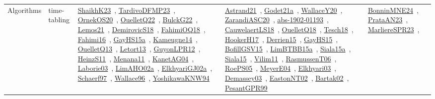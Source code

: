 {\begin{longtable}{lp{3cm}>{\raggedright\arraybackslash}p{6cm}>{\raggedright\arraybackslash}p{6cm}>{\raggedright\arraybackslash}p{8cm}}
\index{time-tabling}\index{Algorithms!time-tabling}Algorithms & time-tabling & \href{../works/ShaikhK23.pdf}{ShaikhK23}~\cite{ShaikhK23}, \href{../works/TardivoDFMP23.pdf}{TardivoDFMP23}~\cite{TardivoDFMP23}, \href{../works/OrnekOS20.pdf}{OrnekOS20}~\cite{OrnekOS20}, \href{../works/OuelletQ22.pdf}{OuelletQ22}~\cite{OuelletQ22}, \href{../works/BulckG22.pdf}{BulckG22}~\cite{BulckG22}, \href{../works/Lemos21.pdf}{Lemos21}~\cite{Lemos21}, \href{../works/DemirovicS18.pdf}{DemirovicS18}~\cite{DemirovicS18}, \href{../works/FahimiOQ18.pdf}{FahimiOQ18}~\cite{FahimiOQ18}, \href{../works/Fahimi16.pdf}{Fahimi16}~\cite{Fahimi16}, \href{../works/GayHS15a.pdf}{GayHS15a}~\cite{GayHS15a}, \href{../works/Kameugne14.pdf}{Kameugne14}~\cite{Kameugne14}, \href{../works/OuelletQ13.pdf}{OuelletQ13}~\cite{OuelletQ13}, \href{../works/Letort13.pdf}{Letort13}~\cite{Letort13}, \href{../works/GuyonLPR12.pdf}{GuyonLPR12}~\cite{GuyonLPR12}, \href{../works/HeinzS11.pdf}{HeinzS11}~\cite{HeinzS11}, \href{../works/Menana11.pdf}{Menana11}~\cite{Menana11}, \href{../works/KanetAG04.pdf}{KanetAG04}~\cite{KanetAG04}, \href{../works/Laborie03.pdf}{Laborie03}~\cite{Laborie03}, \href{../works/LimAHO02a.pdf}{LimAHO02a}~\cite{LimAHO02a}, \href{../works/ElkhyariGJ02a.pdf}{ElkhyariGJ02a}~\cite{ElkhyariGJ02a}, \href{../works/Schaerf97.pdf}{Schaerf97}~\cite{Schaerf97}, \href{../works/Wallace96.pdf}{Wallace96}~\cite{Wallace96}, \href{../works/YoshikawaKNW94.pdf}{YoshikawaKNW94}~\cite{YoshikawaKNW94} & \href{../works/Astrand21.pdf}{Astrand21}~\cite{Astrand21}, \href{../works/Godet21a.pdf}{Godet21a}~\cite{Godet21a}, \href{../works/WallaceY20.pdf}{WallaceY20}~\cite{WallaceY20}, \href{../works/ZarandiASC20.pdf}{ZarandiASC20}~\cite{ZarandiASC20}, \href{../works/abs-1902-01193.pdf}{abs-1902-01193}~\cite{abs-1902-01193}, \href{../works/CauwelaertLS18.pdf}{CauwelaertLS18}~\cite{CauwelaertLS18}, \href{../works/OuelletQ18.pdf}{OuelletQ18}~\cite{OuelletQ18}, \href{../works/Tesch18.pdf}{Tesch18}~\cite{Tesch18}, \href{../works/HookerH17.pdf}{HookerH17}~\cite{HookerH17}, \href{../works/Derrien15.pdf}{Derrien15}~\cite{Derrien15}, \href{../works/GayHS15.pdf}{GayHS15}~\cite{GayHS15}, \href{../works/BofillGSV15.pdf}{BofillGSV15}~\cite{BofillGSV15}, \href{../works/LimBTBB15a.pdf}{LimBTBB15a}~\cite{LimBTBB15a}, \href{../works/Siala15a.pdf}{Siala15a}~\cite{Siala15a}, \href{../works/Siala15.pdf}{Siala15}~\cite{Siala15}, \href{../works/Vilim11.pdf}{Vilim11}~\cite{Vilim11}, \href{../works/RasmussenT06.pdf}{RasmussenT06}~\cite{RasmussenT06}, \href{../works/RoePS05.pdf}{RoePS05}~\cite{RoePS05}, \href{../works/MeyerE04.pdf}{MeyerE04}~\cite{MeyerE04}, \href{../works/Elkhyari03.pdf}{Elkhyari03}~\cite{Elkhyari03}, \href{../works/Demassey03.pdf}{Demassey03}~\cite{Demassey03}, \href{../works/EastonNT02.pdf}{EastonNT02}~\cite{EastonNT02}, \href{../works/Bartak02.pdf}{Bartak02}~\cite{Bartak02}, \href{../works/PesantGPR99.pdf}{PesantGPR99}~\cite{PesantGPR99} & \href{../works/BonninMNE24.pdf}{BonninMNE24}~\cite{BonninMNE24}, \href{../works/PrataAN23.pdf}{PrataAN23}~\cite{PrataAN23}, \href{../works/MarliereSPR23.pdf}{MarliereSPR23}~\cite{MarliereSPR23}, 
\end{longtable}}
